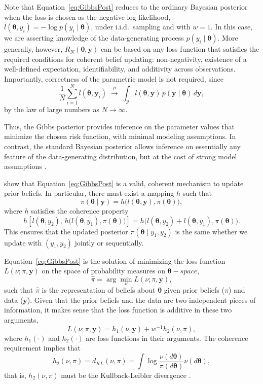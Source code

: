 Note that Equation~\ref{eq:GibbsPost} reduces to the ordinary Bayesian posterior when the loss is chosen as the negative log-likelihood, $l(\boldsymbol{\theta},y_i)=-\log p(y_i\mid\boldsymbol{\theta})$, under i.i.d.\ sampling and with $w=1$. In this case, we are asserting knowledge of the data-generating process $p(y_i\mid \boldsymbol{\theta})$. More generally, however, $R_N(\boldsymbol{\theta},\mathbf{y})$ can be based on any loss function that satisfies the required conditions for coherent belief updating: non-negativity, existence of a well-defined expectation, identifiability, and additivity across observations. Importantly, correctness of the parametric model is not required, since
\[
\frac{1}{N}\sum_{i=1}^N l(\boldsymbol{\theta},\mathbf{y}_i)\;\stackrel{p}{\longrightarrow}\;\int_{\mathcal{Y}} l(\boldsymbol{\theta},\mathbf{y})\,p(\mathbf{y}\mid \boldsymbol{\theta})\,d\mathbf{y},
\]
by the law of large numbers as $N\to\infty$.

Thus, the Gibbs posterior provides inference on the parameter values that minimize the chosen risk function, with minimal modeling assumptions. In contrast, the standard Bayesian posterior allows inference on essentially any feature of the data-generating distribution, but at the cost of strong model assumptions \cite{Syring2019}.

\cite{bissiri2016general} show that Equation~\ref{eq:GibbsPost} is a valid, coherent mechanism to update prior beliefs. In particular, there must exist a mapping $h$ such that
\[
\pi(\boldsymbol{\theta}\mid \mathbf{y}) = h\!\big(l(\boldsymbol{\theta},\mathbf{y}),\pi(\boldsymbol{\theta})\big),
\]
where $h$ satisfies the coherence property
\[
h\!\left[l(\boldsymbol{\theta},y_2),\,h\!\big(l(\boldsymbol{\theta},y_1),\pi(\boldsymbol{\theta})\big)\right]
= h\!\big(l(\boldsymbol{\theta},y_2)+l(\boldsymbol{\theta},y_1),\pi(\boldsymbol{\theta})\big).
\]
This ensures that the updated posterior $\pi(\boldsymbol{\theta}\mid y_1,y_2)$ is the same whether we update with $(y_1,y_2)$ jointly or sequentially.

Equation~\ref{eq:GibbsPost} is the solution of minimizing the loss function $L(\nu;\pi,\mathbf{y})$ on the space of probability measures on $\mathbf{\theta}-space$,
\[
\hat{\pi}=\arg\min_{\nu} L(\nu;\pi,\mathbf{y}),
\]
such that $\hat{\pi}$ is the representation of beliefs about $\boldsymbol{\theta}$ given prior beliefs ($\pi$) and data ($\mathbf{y}$). Given that the prior beliefs and the data are two independent pieces of information, it makes sense that the loss function is additive in these two arguments, 
\[
L(\nu;\pi,\mathbf{y})=h_1(\nu,\mathbf{y})+w^{-1}h_2(\nu,\pi),
\] 
where $h_1(\cdot)$ and $h_2(\cdot)$ are loss functions in their arguments.
The coherence requirement implies that
\[
h_2(\nu,\pi)=d_{KL}(\nu,\pi)=\int \log\frac{\nu(d\boldsymbol{\theta})}{\pi(d\boldsymbol{\theta})} \nu(d\boldsymbol{\theta}),
\]
that is, $h_2(\nu,\pi)$ must be the Kullback-Leibler divergence \cite{bissiri2016general}.

